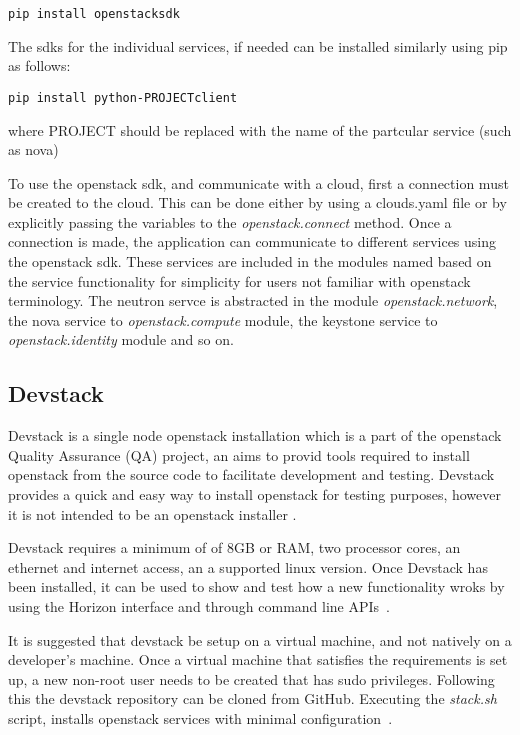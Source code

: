 \begin{verbatim}
pip install openstacksdk
\end{verbatim}

The sdks for the individual services, if needed can be installed
similarly using pip as follows:

\begin{verbatim}
pip install python-PROJECTclient
\end{verbatim}

where PROJECT should be replaced with the name of the partcular
service (such as nova)

To use the openstack sdk, and communicate with a cloud, first a
connection must be created to the cloud. This can be done either by
using a clouds.yaml file or by explicitly passing the variables to
the \emph{openstack.connect\(\)} method. Once a connection is made,
the application can communicate to different services using the
openstack sdk. These services are included in the modules named based
on the service functionality for simplicity for users not familiar
with openstack terminology. The neutron servce is abstracted in the
module \emph{openstack.network}, the nova service
to \emph{openstack.compute} module, the keystone service
to \emph{openstack.identity} module and so on.

\subsection{Devstack}
Devstack is a single node openstack installation which is a part of
the openstack Quality Assurance (QA) project, an aims to provid tools
required to install openstack from the source code to facilitate
development and testing. Devstack provides a quick and easy way to
install openstack for testing purposes, however it is not intended to
be an openstack installer
\cite{hid-sp18-503-devstack}.

Devstack requires a minimum of of 8GB or RAM, two processor cores, an
ethernet and internet access, an a supported linux version. Once
Devstack has been installed, it can be used to show and test how a new
functionality wroks by using the Horizon interface and through command
line APIs~\cite{hid-sp18-503-devstack}.

It is suggested that devstack be setup on a virtual machine, and not
natively on a developer's machine. Once a virtual machine that
satisfies the requirements is set up, a new non-root user needs to be
created that has sudo privileges.  Following this the devstack
repository can be cloned from GitHub. Executing the
\emph{stack.sh} script, installs openstack services with minimal
configuration~\cite{hid-sp18-503-devstack-setup}.

